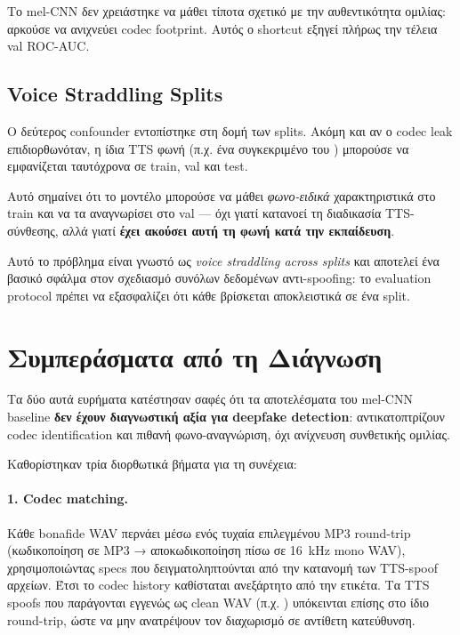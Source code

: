 Το mel-CNN δεν χρειάστηκε να μάθει τίποτα σχετικό με την αυθεντικότητα
ομιλίας: αρκούσε να ανιχνεύει codec footprint.
Αυτός ο shortcut εξηγεί πλήρως την τέλεια val ROC-AUC.

\subsection{Voice Straddling Splits}
\label{subsec:voice-straddling}

Ο δεύτερος confounder εντοπίστηκε στη δομή των splits.
Ακόμη και αν ο codec leak επιδιορθωνόταν, η ίδια TTS φωνή
(π.χ. ένα συγκεκριμένο  του )
μπορούσε να εμφανίζεται ταυτόχρονα σε train, val και test.

Αυτό σημαίνει ότι το μοντέλο μπορούσε να μάθει \emph{φωνο-ειδικά}
χαρακτηριστικά στο train και να τα αναγνωρίσει στο val —
όχι γιατί κατανοεί τη διαδικασία TTS-σύνθεσης,
αλλά γιατί \textbf{έχει ακούσει αυτή τη φωνή κατά την εκπαίδευση}.

Αυτό το πρόβλημα είναι γνωστό ως \emph{voice straddling across splits}
και αποτελεί ένα βασικό σφάλμα στον σχεδιασμό συνόλων δεδομένων
αντι-spoofing: το evaluation protocol πρέπει να εξασφαλίζει ότι κάθε
 βρίσκεται αποκλειστικά σε ένα split.

\section{Συμπεράσματα από τη Διάγνωση}
\label{sec:phase4-diagnosis}

Τα δύο αυτά ευρήματα κατέστησαν σαφές ότι τα αποτελέσματα του
mel-CNN baseline \textbf{δεν έχουν διαγνωστική αξία για deepfake detection}:
αντικατοπτρίζουν codec identification και πιθανή φωνο-αναγνώριση,
όχι ανίχνευση συνθετικής ομιλίας.

Καθορίστηκαν τρία διορθωτικά βήματα για τη συνέχεια:

\paragraph{1. Codec matching.}
Κάθε bonafide WAV περνάει μέσω ενός τυχαία επιλεγμένου MP3
round-trip (κωδικοποίηση σε MP3 → αποκωδικοποίηση πίσω σε 16~kHz mono WAV),
χρησιμοποιώντας specs που δειγματοληπτούνται από την κατανομή των
TTS-spoof αρχείων.
Έτσι το codec history καθίσταται ανεξάρτητο από την ετικέτα.
Τα TTS spoofs που παράγονται εγγενώς ως clean WAV
(π.χ. ) υπόκεινται επίσης στο ίδιο round-trip,
ώστε να μην ανατρέψουν τον διαχωρισμό σε αντίθετη κατεύθυνση.

